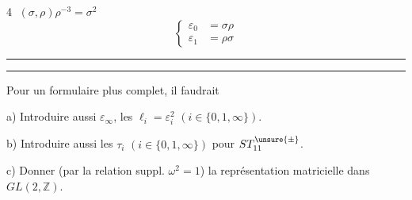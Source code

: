 \textcircled{4} $(\sigma,\rho)$\quad$\boxed{\boxed{\rho^{-3}=\sigma^2}}$
\[
\left\{\begin{aligned}\varepsilon_0&=\sigma\rho\\\varepsilon_1&=\rho\sigma\end{aligned}\right.
\]
\rule{\linewidth}{.4pt}\par\rule{\linewidth}{.4pt}

Pour un formulaire plus complet, il faudrait

a) Introduire aussi $\varepsilon_\infty$,  les $\ell_i=\varepsilon_i^2$ $(i\in\{0,1,\infty\})$.

b) Introduire aussi les $\tau_i$ $(i\in\{0,1,\infty\})$ pour $ST_{11}^{\unsure{\pm}}$.

c) Donner (par la relation suppl. $\omega^2=1$) la représentation matricielle dans $GL(2,\mathbb Z)$.

